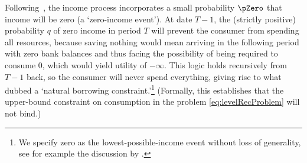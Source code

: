 \documentclass[BufferStockTheory]{subfiles}
\begin{document}
Following~\cite{zeldesStochastic}, the income process incorporates a small probability $\pZero$ that income will be zero (a `zero-income event').  At date $T-1$, the (strictly positive) probability $q$ of zero income in period $T$ will prevent the consumer from spending all resources, because saving nothing would mean arriving in the following period with zero bank balances and thus facing the possibility of being required to consume 0, which would yield utility of $-\infty$. This logic holds recursively from $T-1$ back, so  the consumer will never spend everything, giving rise to what \cite{aiyagari:ge} dubbed a `natural borrowing constraint.'\footnote{We specify zero as the lowest-possible-income event without loss of generality, see for example the discussion by \cite{aiyagari:ge}.} (Formally, this establishes that the upper-bound constraint on consumption in the problem \eqref{eq:levelRecProblem} will not bind.)

\hypertarget{PDV}{}

\begin{comment}
we do not need the below?
The model looks more special than it is. In particular, a positive probability of zero-income events may seem objectionable (despite empirical support). However, a nonzero minimum value of $\tranShkAll$ (motivated, say, by the existence of unemployment insurance) could be handled by capitalizing the present discounted value (PDV) of minimum income into current market assets,\footnote{So long as unemployment benefits are proportional to $\PermLvl_{t}$; see the discussion in Section~\ref{sec:discussConvergence}.} and transforming that model back into this one.  And no key results would change if the transitory shocks were persistent but mean-reverting (instead of iid).\@ Also, the assumption of a positive point mass for the worst realization of the transitory shock is inessential, but simplifies the proofs and is a powerful aid to intuition.
\end{comment}

\begin{comment}
Following footnotes and text were removed from the discussion above

\footnote{We calibrate this probability to 0.005 to match data from the Panel Study of Income Dynamics (\cite{carrollBrookings}).}

\footnote{\cite{rabaultBorrowing} and~\cite{lsIncFluct} analyze cases where the shock processes have unbounded support.} 

and when $\permShkIndMin=\permShkIndMax=1$ the model becomes the degenerate case with no permanent shocks
\end{comment}
\end{document}
